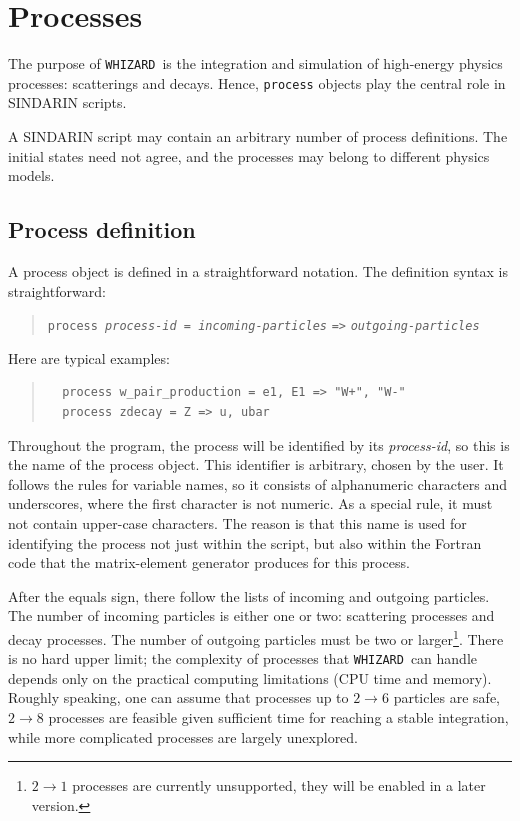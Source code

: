 \documentclass[12pt]{book}
\newcommand{\ttt}[1]{\texttt{#1}}
\newcommand{\whizard}{\texttt{WHIZARD}}
\begin{document}
\section{Processes}
\label{sec:processes}

The purpose of \whizard\ is the integration and simulation of high-energy
physics processes: scatterings and decays.  Hence, \ttt{process} objects play
the central role in SINDARIN scripts.

A SINDARIN script may contain an arbitrary number of process definitions.  The
initial states need not agree, and the processes may belong to different
physics models.


\subsection{Process definition}
\label{sec:procdef}

A process object is defined in a straightforward notation.  The definition
syntax is straightforward:
\begin{quote}
\begin{footnotesize}
  \ttt{process \textit{process-id} = \textit{incoming-particles}} \verb|=>|
  \ttt{\textit{outgoing-particles}}
\end{footnotesize}
\end{quote}
Here are typical examples:
\begin{quote}
\begin{footnotesize}
\begin{verbatim}
  process w_pair_production = e1, E1 => "W+", "W-"
  process zdecay = Z => u, ubar
\end{verbatim}
\end{footnotesize}
\end{quote}
Throughout the program, the process will be identified by its
\textit{process-id}, so this is the name of the process object.  This
identifier is arbitrary, chosen by the user.  It follows the rules for
variable names, so it consists of alphanumeric characters and underscores,
where the first character is not numeric.  As a special rule, it must not
contain upper-case characters.  The reason is that this name is used for
identifying the process not just within the script, but also within the
Fortran code that the matrix-element generator produces for this process.

After the equals sign, there follow the lists of incoming and outgoing
particles.  The number of incoming particles is either one or two: scattering
processes and decay processes.  The number of outgoing particles must be two
or larger\footnote{$2\to 1$ processes are currently unsupported, they will be
  enabled in a later version.}.  There is no hard upper limit; the complexity
of processes that \whizard\ can handle depends only on the practical computing
limitations (CPU time and memory).  Roughly speaking, one can assume that
processes up to $2\to 6$ particles are safe, $2\to 8$ processes are feasible
given sufficient time for reaching a stable integration, while more
complicated processes are largely unexplored.
\end{document}
